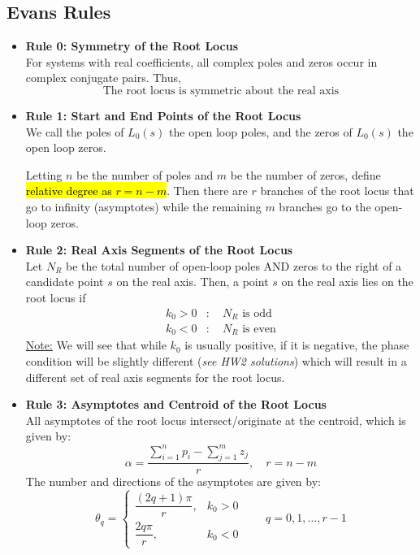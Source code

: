 ﻿\documentclass[12pt]{article}
\begin{document}
\subsection*{Evans Rules}
\begin{itemize}
    \item \textbf{Rule 0: Symmetry of the Root Locus}\\
    For systems with real coefficients, all complex poles and zeros occur in complex conjugate pairs. Thus,
    \[\boxed{\text{The root locus is symmetric about the real axis}}\]
    \item \textbf{Rule 1: Start and End Points of the Root Locus} \\
    We call the poles of $L_0(s)$ the open loop poles, and the zeros of $L_0(s)$ the open loop zeros. 
    \begin{center}
\end{center}
Letting $n$ be the number of poles and $m$ be the number of zeros, define \hl{relative degree as $r = n - m$}. Then there are $r$ branches of the root locus that go to infinity (asymptotes) while the remaining $m$ branches go to the open-loop zeros.
\item \textbf{Rule 2: Real Axis Segments of the Root Locus} \\
Let $N_R$ be the total number of open-loop poles AND zeros to the right of a candidate point $s$ on the real axis. Then, a point $s$  on the real axis lies on the root locus if 
\[
\boxed{
\begin{aligned}
k_0 > 0 &: \quad N_R \text{ is odd}\\
k_0 < 0 &: \quad N_R \text{ is even}
\end{aligned}
}
\]
\underline{Note:} We will see that while $k_0$ is usually positive, if it is negative, the phase condition will be slightly different (\textit{see HW2 solutions}) which will result in a different set of real axis segments for the root locus.
\item \textbf{Rule 3: Asymptotes and Centroid of the Root Locus} \\
All asymptotes of the root locus intersect/originate at the centroid, which is given by:
\[
\boxed{
\alpha = \frac{\displaystyle\sum_{i=1}^{n} p_i - \displaystyle\sum_{j=1}^{m} z_j}{r},\quad r = n - m
}
\]
The number and directions of the asymptotes are given by:
\[
\boxed{
\theta_q =
\begin{cases}
\dfrac{(2q+1)\pi}{r}, & k_0 > 0 \\[6pt]
\dfrac{2q\pi}{r}, & k_0 < 0
\end{cases}
\qquad q=0,1,\ldots,r-1
}
\]
\end{itemize}
\begin{center}
    {\LARGE\bfseries {}\par}
\end{center}
\end{document}
